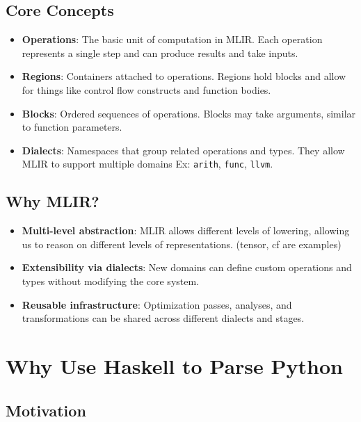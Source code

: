 \documentclass[11pt]{article}
\begin{document}
\subsection{Core Concepts}
\begin{itemize}
	\item \textbf{Operations}: The basic unit of computation in MLIR. Each
	      operation represents a single step and can produce results and take
	      inputs.

	\item \textbf{Regions}: Containers attached to operations. Regions hold blocks
	      and allow for things like control flow constructs and
	      function bodies.

	\item \textbf{Blocks}: Ordered sequences of operations.
	      Blocks may take arguments, similar to function parameters.

	\item \textbf{Dialects}: Namespaces that group related operations and types.
	      They allow MLIR to support multiple domains Ex: \texttt{arith},
	      \texttt{func}, \texttt{llvm}.
\end{itemize}

\subsection{Why MLIR?}
\begin{itemize}
	\item \textbf{Multi-level abstraction}: MLIR allows different levels of
	      lowering, allowing us to reason on different levels of representations.
	      (tensor, cf are examples)

	\item \textbf{Extensibility via dialects}: New domains can define custom
	      operations and types without modifying the core system.

	\item \textbf{Reusable infrastructure}: Optimization passes, analyses, and
	      transformations can be shared across different dialects and stages.
\end{itemize}

\section{Why Use Haskell to Parse Python}

\subsection{Motivation}
\end{document}
